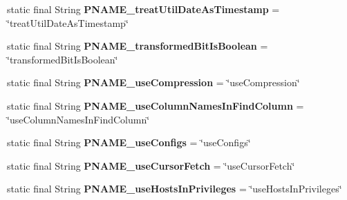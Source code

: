\begin{DoxyCompactItemize}
static final String {\bfseries P\+N\+A\+M\+E\+\_\+treat\+Util\+Date\+As\+Timestamp} = \char`\"{}treat\+Util\+Date\+As\+Timestamp\char`\"{}
\item 
\mbox{\label{classcom_1_1mysql_1_1cj_1_1conf_1_1_property_definitions_a681199db5114db7c2d469077e04c9ff3}} 
static final String {\bfseries P\+N\+A\+M\+E\+\_\+transformed\+Bit\+Is\+Boolean} = \char`\"{}transformed\+Bit\+Is\+Boolean\char`\"{}
\item 
\mbox{\label{classcom_1_1mysql_1_1cj_1_1conf_1_1_property_definitions_aea3b1d57eb56e4695337ee23ef78194e}} 
static final String {\bfseries P\+N\+A\+M\+E\+\_\+use\+Compression} = \char`\"{}use\+Compression\char`\"{}
\item 
\mbox{\label{classcom_1_1mysql_1_1cj_1_1conf_1_1_property_definitions_aa16ecd4826beb42f7671eae9c6fdff7c}} 
static final String {\bfseries P\+N\+A\+M\+E\+\_\+use\+Column\+Names\+In\+Find\+Column} = \char`\"{}use\+Column\+Names\+In\+Find\+Column\char`\"{}
\item 
\mbox{\label{classcom_1_1mysql_1_1cj_1_1conf_1_1_property_definitions_ad57da9f284d14d83823c3886c2489868}} 
static final String {\bfseries P\+N\+A\+M\+E\+\_\+use\+Configs} = \char`\"{}use\+Configs\char`\"{}
\item 
\mbox{\label{classcom_1_1mysql_1_1cj_1_1conf_1_1_property_definitions_a6608085ab3938e4a1a2235d2b5b9f0dd}} 
static final String {\bfseries P\+N\+A\+M\+E\+\_\+use\+Cursor\+Fetch} = \char`\"{}use\+Cursor\+Fetch\char`\"{}
\item 
\mbox{\label{classcom_1_1mysql_1_1cj_1_1conf_1_1_property_definitions_a86edc2386f293d98746bade8cf7a8654}} 
static final String {\bfseries P\+N\+A\+M\+E\+\_\+use\+Hosts\+In\+Privileges} = \char`\"{}use\+Hosts\+In\+Privileges\char`\"{}
\item 
\mbox{\label{classcom_1_1mysql_1_1cj_1_1conf_1_1_property_definitions_a2109d5b70f3ebceaca4766b3ddc1139d}} 

\end{DoxyCompactItemize}
